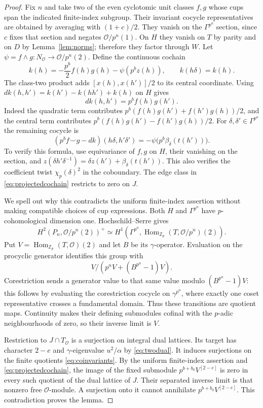 \documentclass[11pt]{article}
\theoremstyle{definition}\newtheorem{definition}[theorem]{Definition}
\newcommand{\Z}{\mathbb Z}\newcommand{\Q}{\mathbb Q}
\newcommand{\Hom}{\operatorname{Hom}}\newcommand{\Cl}{\operatorname{Cl}}
\begin{document}
\begin{proof}
Fix $n$ and take two of the even cyclotomic unit classes $f,g$
whose cups span the indicated finite-index subgroup. Their invariant cocycle
representatives are obtained by averaging with $(1+c)/2$.
They vanish on the $\Gamma^{p^n}$ section, since $c$ fixes
that section and negates $\mathcal O/p^n(1)$. On $H$ they
vanish on $T$ by parity and on $D$ by Lemma~\ref{lem:norms};
therefore they factor through $W$.
Let $\psi=f\wedge g:N_{\mathcal O}\to\mathcal O/p^n(2)$.
Define the continuous cochain
\[
 k(h)=-\frac{p^b}{2}f(h)g(h)-\psi(p^b z(h)),\qquad
 k(h\delta)=k(h).
\]
The class-two product adds $[x(h),x(h')]/2$ to its central
coordinate. Using $dk(h,h')=k(h')-k(hh')+k(h)$ on $H$
gives
\[
                       dk(h,h')=p^bf(h)g(h').
\]
Indeed the quadratic term contributes
$p^b(f(h)g(h')+f(h')g(h))/2$, and the central term contributes
$p^b(f(h)g(h')-f(h')g(h))/2$.
For $\delta,\delta'\in\Gamma^{p^n}$ the remaining cocycle is
\begin{equation}
 (p^bf\smile g-dk)(h\delta,h'\delta')
       =-\psi\bigl(p^b\beta_\delta(t(h'))\bigr).
 \label{eq:projectedcochain}
\end{equation}
To verify this formula, use equivariance of $f,g$ on $H$,
their vanishing on the section, and
$z(\delta h'\delta^{-1})=\delta z(h')+
\beta_\delta(t(h'))$. This also verifies the coefficient
twist $\chi_p(\delta)^2$ in the coboundary.
The edge class in \eqref{eq:projectedcochain} restricts to zero
on $J$.

We spell out why this contradicts the uniform finite-index assertion
without making compatible choices of cup expressions.
Both $H$ and $\Gamma^{p^n}$ have $p$-cohomological dimension
one. Hochschild--Serre gives
\[
 H^2(P_n,\mathcal O/p^n(2))^+
 \simeq H^1(\Gamma^{p^n},
             \Hom_{\Z_p}(T,\mathcal O/p^n)(2)).
\]
Put $V=\Hom_{\Z_p}(T,\mathcal O)(2)$ and let $B$ be its
$\gamma$-operator. Evaluation on the procyclic generator
identifies this group with
\begin{equation}
             V/(p^nV+(B^{p^n}-1)V).
             \label{eq:coinvariants}
\end{equation}
Corestriction sends a generator value to that same value
modulo $(B^{p^n}-1)V$: this follows by evaluating the
corestriction cocycle on $\gamma^{p^n}$, where exactly one
coset representative crosses a fundamental domain.
Thus these transitions are quotient maps.
Continuity makes their defining submodules cofinal with the
$p$-adic neighbourhoods of zero, so their inverse limit is $V$.

Restriction to $J\cap T_{\mathcal O}$ is a surjection on
integral dual lattices. Its target has character $2-e$ and
$\gamma$-eigenvalue $u^2/\alpha$ by \eqref{eq:twodual}.
It induces surjections on the finite quotients
\eqref{eq:coinvariants}. By the uniform finite-index assertion and
\eqref{eq:projectedcochain}, the image of the fixed submodule
$p^{b+b_0}V^{[2-e]}$ is zero in every such quotient of the dual
lattice of $J$. Their separated inverse limit is that
nonzero free $\mathcal O$-module. A surjection onto it cannot
annihilate $p^{b+b_0}V^{[2-e]}$. This contradiction proves the lemma.
\end{proof}
\end{document}
